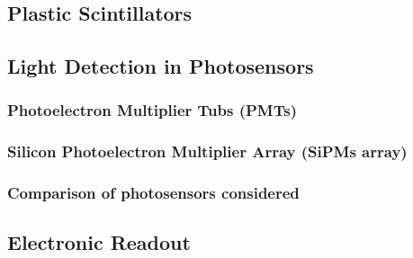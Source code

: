 \documentclass[12pt,a4paper]{book}
\begin{document}
		\subsection{Plastic Scintillators} \label{subsec:PlasticScintillators}
		
		
			
		\subsection{Light Detection in Photosensors}\label{subsec:Photosensors}
		
	
			\subsubsection{Photoelectron Multiplier Tubs (PMTs)}\label{subsubsec:PMTs}
			
		
			\subsubsection{Silicon Photoelectron Multiplier Array (SiPMs array)}\label{subsubsec:SiPM}
			
			
			\subsubsection[Comparison Photosensors]{Comparison of photosensors considered}\label{subsubsec:ComparisonPhotosensors}
			
			\newpage
					
		\subsection{Electronic Readout}\label{subsec:Electronic}\label{subsec:IntroductionHemos hablado ElectronicalSystem}
			
	
\end{document}
